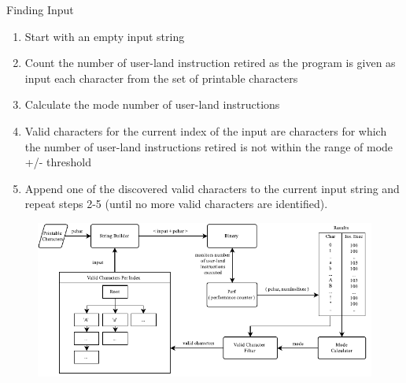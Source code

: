 \documentclass[pdf]{beamer}
\begin{document}
\begin{frame}{Finding Input}
\begin{enumerate}
\item Start with an empty input string
\pause
\item Count the number of user-land instruction retired as the program is given as input each character from the set of printable characters
\pause
\item Calculate the mode number of user-land instructions 
\pause
\item Valid characters for the current index of the input are characters for which the number of user-land instructions retired is not within the range of mode +/- threshold
\item Append one of the discovered valid characters to the current input string and repeat steps 2-5 (until no more valid characters are identified).
\end{enumerate}
\end{frame}

\begin{frame}{}
\begin{figure}
\includegraphics[scale=0.90]{../paper/architecture.pdf}
\end{figure}
\end{frame}
\end{document}
